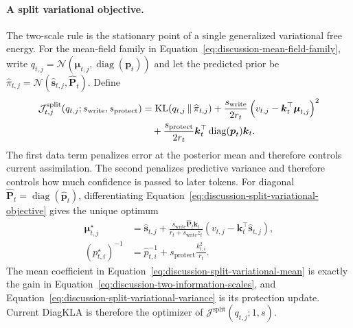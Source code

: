 \documentclass[11pt]{article}
\newcommand{\vct}[1]{\boldsymbol{#1}}
\newcommand{\diag}{\operatorname{diag}}
\begin{document}
\paragraph{A split variational objective.}
The two-scale rule is the stationary point of a single generalized variational free energy. For
the mean-field family in Equation~\eqref{eq:discussion-mean-field-family}, write
$q_{t,j}=\mathcal{N}(\vct{\mu}_{t,j},\diag(\vct{p}_t))$ and let the predicted prior be
$\widehat\pi_{t,j}=\mathcal{N}(\widehat{\vct{s}}_{t,j},\widehat{\vct{P}}_t)$. Define
\begin{align}
  \mathcal{J}_{t,j}^{\mathrm{split}}
    (q_{t,j};s_{\mathrm{write}},s_{\mathrm{protect}})
  &=\operatorname{KL}(q_{t,j}\,\|\,\widehat\pi_{t,j})
    +\frac{s_{\mathrm{write}}}{2r_t}
      \left(v_{t,j}-\vct{k}_t^\top\vct{\mu}_{t,j}\right)^2 \notag\\
  &\quad
    +\frac{s_{\mathrm{protect}}}{2r_t}
      \vct{k}_t^\top\diag(\vct{p}_t)\vct{k}_t.
  \label{eq:discussion-split-variational-objective}
\end{align}
The first data term penalizes error at the posterior mean and therefore controls current
assimilation. The second penalizes predictive variance and therefore controls how much confidence
is passed to later tokens. For diagonal
$\widehat{\vct{P}}_t=\diag(\widehat{\vct{p}}_t)$, differentiating
Equation~\eqref{eq:discussion-split-variational-objective} gives the unique optimum
\begin{align}
  \vct{\mu}_{t,j}^{\star}
  &=\widehat{\vct{s}}_{t,j}
    +\frac{s_{\mathrm{write}}\widehat{\vct{P}}_t\vct{k}_t}
      {r_t+s_{\mathrm{write}}z_t}
    \left(v_{t,j}-\vct{k}_t^\top\widehat{\vct{s}}_{t,j}\right),
  \label{eq:discussion-split-variational-mean}\\
  (p_{t,i}^{\star})^{-1}
  &=\widehat p_{t,i}^{-1}
    +s_{\mathrm{protect}}\frac{k_{t,i}^2}{r_t}.
  \label{eq:discussion-split-variational-variance}
\end{align}
The mean coefficient in Equation~\eqref{eq:discussion-split-variational-mean} is exactly the
gain in Equation~\eqref{eq:discussion-two-information-scales}, and
Equation~\eqref{eq:discussion-split-variational-variance} is its protection update. Current
DiagKLA is therefore the optimizer of
$\mathcal{J}^{\mathrm{split}}(q_{t,j};1,s)$.
\end{document}
